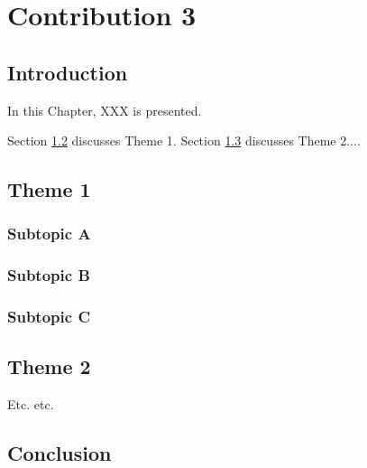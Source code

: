 
\chapter{Contribution 3}\label{chap:contrib3}

\section{Introduction}

In this Chapter, XXX is presented.

Section \ref{sec:contrib3:theme1} discusses Theme 1. Section \ref{sec:contrib3:theme2} discusses Theme 2....

\section{Theme 1}\label{sec:contrib3:theme1}

\subsection{Subtopic A}\label{sec:contrib3:theme1:A}

\subsection{Subtopic B}\label{sec:contrib3:theme1:B}

\subsection{Subtopic C}\label{sec:contrib3:theme1:C}

\section{Theme 2}\label{sec:contrib3:theme2}

Etc. etc.

\section{Conclusion}
